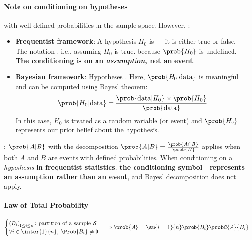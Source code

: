 \paragraph{Note on conditioning on hypotheses}
with well-defined probabilities in the sample space. However, :
\begin{itemize}
    \item \textbf{Frequentist framework}: A hypothesis $H_0$ is 
        — it is either true or false. The notation , i.e., assuming $H_0$ is true.
         because
        $\prob{H_0}$ is undefined. \textbf{The conditioning is on an \emph{assumption}, not an event}.
    \item \textbf{Bayesian framework}: Hypotheses .
        Here, $\prob{H_0|\text{data}}$ is meaningful and can be computed using Bayes' theorem:
        $$\prob{H_0|\text{data}} = \dfrac{\prob{\text{data}|H_0} \times \prob{H_0}}{\prob{\text{data}}}$$
        In this case, $H_0$ is treated as a random variable (or event) and $\prob{H_0}$ represents
        our prior belief about the hypothesis.
\end{itemize}
: $\prob{A|B}$ with the decomposition $\prob{A|B} = \frac{\prob{A \cap B}}{\prob{B}}$
applies when both $A$ and $B$ are events with defined probabilities. When conditioning on a
\emph{hypothesis} \textbf{in frequentist statistics, the conditioning symbol $|$ represents an 
assumption rather than an event}, and Bayes' decomposition does not apply.

\paragraph{Law of Total Probability}
$
\begin{cases}
    \left(B_{i}\right)_{1\leq i\leq n}\text{: partition of a sample }\mathcal{S}\\
    \forall i\in \inter{1}{n},~\Prob{B_{i}} \neq 0
\end{cases} 
\Rightarrow \prob{A} = \su{i=1}{n}\prob{B_{i}}\probC{A}{B_{i}}
$


